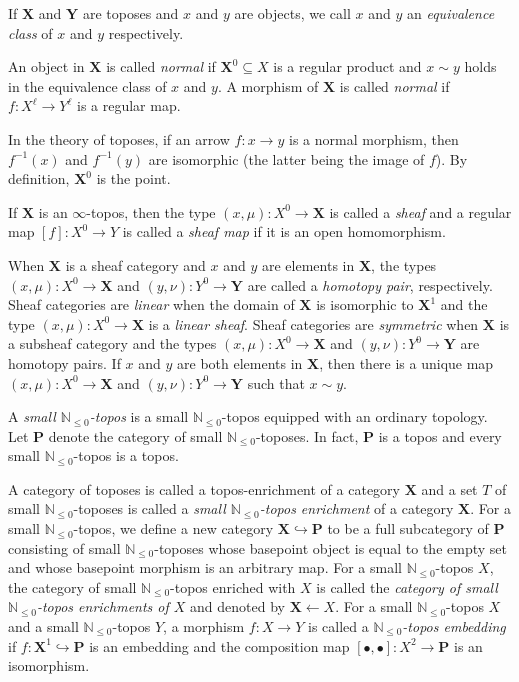 \documentclass[a4paper,reqno,oneside]{article}
\begin{document}
If $\mathbf{X}$ and $\mathbf{Y}$ are toposes and $x$ and $y$ are objects, we call $x$ and $y$ an \textit{equivalence class} of $x$ and $y$ respectively. 

An object in $\mathbf{X}$ is called \textit{normal} if $\mathbf{X}^0\subseteq X$ is a regular product and $x\sim y$ holds in the equivalence class of $x$ and $y$. A morphism of $\mathbf{X}$ is called \textit{normal} if $f:X^\ell\to Y^\ell$ is a regular map.

In the theory of toposes, if an arrow $f:x\to y$ is a normal morphism, then $f^{-1}(x)$ and $f^{-1}(y)$ are isomorphic (the latter being the image of $f$). By definition, $\mathbf{X}^0$ is the point. 

If $\mathbf{X}$ is an $\infty$-topos, then the type $(x,\mu):X^0\to\mathbf{X}$ is called a \textit{sheaf} and a regular map $[f]:X^0\to Y$ is called a \textit{sheaf map} if it is an open homomorphism.

When $\mathbf{X}$ is a sheaf category and $x$ and $y$ are elements in $\mathbf{X}$, the types $(x,\mu):X^0\to\mathbf{X}$ and $(y,\nu):Y^0\to\mathbf{Y}$ are called a \textit{homotopy pair}, respectively. Sheaf categories are \textit{linear} when the domain of $\mathbf{X}$ is isomorphic to $\mathbf{X}^1$ and the type $(x,\mu):X^0\to\mathbf{X}$ is a \textit{linear sheaf}. Sheaf categories are \textit{symmetric} when $\mathbf{X}$ is a subsheaf category and the types $(x,\mu):X^0\to\mathbf{X}$ and $(y,\nu):Y^0\to\mathbf{Y}$ are homotopy pairs. If $x$ and $y$ are both elements in $\mathbf{X}$, then there is a unique map $(x,\mu):X^0\to\mathbf{X}$ and $(y,\nu):Y^0\to\mathbf{Y}$ such that $x\sim y$.

A \textit{small $\mathbb{N}_{\leq0}$-topos} is a small $\mathbb{N}_{\leq0}$-topos equipped with an ordinary topology. Let $\mathbf{P}$ denote the category of small $\mathbb{N}_{\leq0}$-toposes. In fact, $\mathbf{P}$ is a topos and every small $\mathbb{N}_{\leq0}$-topos is a topos. 

A category of toposes is called a topos-enrichment of a category $\mathbf{X}$ and a set $T$ of small $\mathbb{N}_{\leq0}$-toposes is called a \textit{small $\mathbb{N}_{\leq0}$-topos enrichment} of a category $\mathbf{X}$. For a small $\mathbb{N}_{\leq0}$-topos, we define a new category $\mathbf{X}\hookrightarrow \mathbf{P}$ to be a full subcategory of $\mathbf{P}$ consisting of small $\mathbb{N}_{\leq0}$-toposes whose basepoint object is equal to the empty set and whose basepoint morphism is an arbitrary map. For a small $\mathbb{N}_{\leq0}$-topos $X$, the category of small $\mathbb{N}_{\leq0}$-topos enriched with $X$ is called the \textit{category of small $\mathbb{N}_{\leq0}$-topos enrichments of $X$} and denoted by $\mathbf{X}\leftarrow X$. For a small $\mathbb{N}_{\leq0}$-topos $X$ and a small $\mathbb{N}_{\leq0}$-topos $Y$, a morphism $f:X\to Y$ is called a \textit{$\mathbb{N}_{\leq0}$-topos embedding} if $f:\mathbf{X}^1\hookrightarrow \mathbf{P}$ is an embedding and the composition map $[\bullet,\bullet]:X^2\to \mathbf{P}$ is an isomorphism. 
\end{document}
